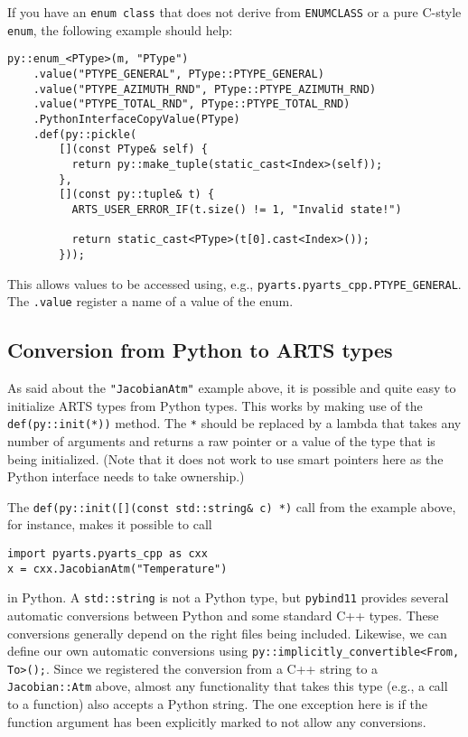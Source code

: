 If you have an \texttt{enum class} that does not derive from \texttt{ENUMCLASS} or a pure C-style \texttt{enum}, the following example should help:
\begin{verbatim}
py::enum_<PType>(m, "PType")
    .value("PTYPE_GENERAL", PType::PTYPE_GENERAL)
    .value("PTYPE_AZIMUTH_RND", PType::PTYPE_AZIMUTH_RND)
    .value("PTYPE_TOTAL_RND", PType::PTYPE_TOTAL_RND)
    .PythonInterfaceCopyValue(PType)
    .def(py::pickle(
        [](const PType& self) {
          return py::make_tuple(static_cast<Index>(self));
        },
        [](const py::tuple& t) {
          ARTS_USER_ERROR_IF(t.size() != 1, "Invalid state!")
          
          return static_cast<PType>(t[0].cast<Index>());
        }));
\end{verbatim}
This allows values to be accessed using, e.g., \texttt{pyarts.pyarts_cpp.PTYPE_GENERAL}.  The \texttt{.value} register a name of a value of the enum.

\subsection{Conversion from Python to ARTS types}
As said about the \texttt{"JacobianAtm"} example above, it is possible and quite easy to initialize ARTS types from Python types.  This works by
making use of the \texttt{def(py::init(*))} method.  The \texttt{*} should be replaced by a lambda that takes any number of arguments and 
returns a raw pointer or a value of the type that is being initialized.  (Note that it does not work to use smart pointers here as
the Python interface needs to take ownership.)

The \texttt{def(py::init([](const std::string& c) {*})} call from the example above, for instance, makes it possible to call
\begin{verbatim}
import pyarts.pyarts_cpp as cxx
x = cxx.JacobianAtm("Temperature")
\end{verbatim}
in Python.  A \texttt{std::string} is not a Python type, but \texttt{pybind11} provides several automatic conversions between
Python and some standard C++ types.  These conversions generally depend on the right files being included.
Likewise, we can define our own automatic conversions using \texttt{py::implicitly_convertible<From, To>();}.  Since we registered the 
conversion from a C++ string to a \texttt{Jacobian::Atm} above, almost any functionality that takes this type (e.g., a call to a function)
also accepts a Python string.  The one exception here is if the function argument has been explicitly marked to not allow any conversions.

